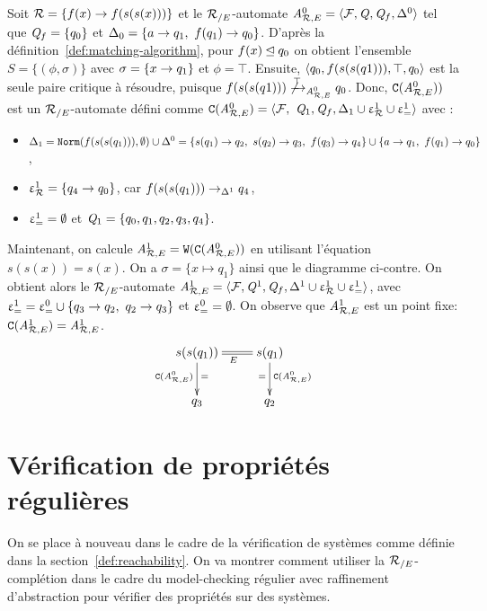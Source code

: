 \begin{example}
  \label{ex:W}
  Soit $\mathcal R = \{f(x) \rightarrow f(s(s(x)))\}$ et le ${\mathcal R_{/E}}$-automate
  ${\mathit A}_{\mathcal R,E}^0 = \langle\mathcal{F},\mathit Q,\mathit Q_f,\Delta^0\rangle$ tel que $\mathit Q_f = \{q_0\}$
  et $\Delta_0 = \{a \rightarrow q_1,\ f(q_1) \rightarrow q_0\}$.
  D'après la définition~\ref{def:matching-algorithm}, pour $f(x) \unlhd q_0$ on obtient l'ensemble $S = \{(\phi,\sigma)\}$
  avec $\sigma = \{x \rightarrow q_1\}$ et $\phi = \top$. Ensuite,
  $\langle q_0, f(s(s(q1))), \top, q_0\rangle$ est la seule paire critique à résoudre, puisque 
  $f(s(s(q1))) \not\xrightarrow{\top}_{{\mathit A}_{\mathcal R,E}^0} q_0$. Donc, $\mathtt{C}({\mathit A}_{\mathcal R,E}^0))$ est un ${\mathcal R_{/E}}$-automate défini comme
  $\mathtt{C}({\mathit A}_{\mathcal R,E}^0) = \langle\mathcal{F},\ \mathit Q_1, \mathit Q_f, \Delta_1 \cup \upvarepsilon_{\mathcal R}^1 \cup \upvarepsilon_{=}^1 \rangle$ avec :
  \begin{itemize}
  \item  $\Delta_1 = \mathtt{Norm}(f(s(s(q_1))),\emptyset) \cup \Delta^0 =
    \{s(q_1) \rightarrow q_2,\ s(q_2) \rightarrow q_3,\ f(q_3) \rightarrow q_4\} \cup \{a \rightarrow q_1,\ f(q_1) \rightarrow q_0\}$,
  \item
    $\upvarepsilon_{\mathcal R}^1 = \{q_4 \rightarrow q_0\}$, car $f(s(s(q_1))) \rightarrow_{\Delta^1} q_4$,
  \item $\upvarepsilon_{=}^1 = \emptyset$ et $\mathit Q_1 = \{q_0,q_1,q_2,q_3,q_4\}$.
  \end{itemize}

  Maintenant, on calcule ${\mathit A}_{\mathcal R,E}^1 = \mathtt{W}(\mathtt{C}({\mathit A}_{\mathcal R,E}^0))$ en utilisant l'équation
  $s(s(x))=s(x)$.  On a $\sigma=\{x \mapsto q_1\}$ ainsi que le diagramme ci-contre.
  On obtient alors le ${\mathcal R_{/E}}$-automate ${\mathit A}_{\mathcal R,E}^1 = \langle \mathcal{F}, \mathit Q^1, \mathit Q_f, \Delta^1 \cup \upvarepsilon_{\mathcal R}^1 \cup \upvarepsilon_{=}^1\rangle$,
  avec $\upvarepsilon_{=}^1= \upvarepsilon_{=}^0 \cup \{q_3 \rightarrow q_2,\ q_2 \rightarrow q_3\}$ et $\upvarepsilon_{=}^0=\emptyset$.  On observe que ${\mathit A}_{\mathcal R,E}^1$
  est un point fixe: $\mathtt{C}({\mathit A}_{\mathcal R,E}^1) = {\mathit A}_{\mathcal R,E}^1$.
  \[\xymatrix{
    s(s(q_1)) \ar@{=}[r]_{E}\ar[d]^{=}_{\compl(\aaexeq^0)} & s(q_1) \ar[d]^{\compl(\aaexeq^0)}_{=}\\
    q_3 & q_2
  }\]
\end{example}


\section{Vérification de propriétés régulières}
On se place à nouveau dans le cadre de la vérification de systèmes comme définie dans la section~\ref{def:reachability}.
On va montrer comment utiliser la ${\mathcal R_{/E}}$-complétion  dans le cadre du model-checking régulier 
avec raffinement d'abstraction pour vérifier des propriétés sur des systèmes.

